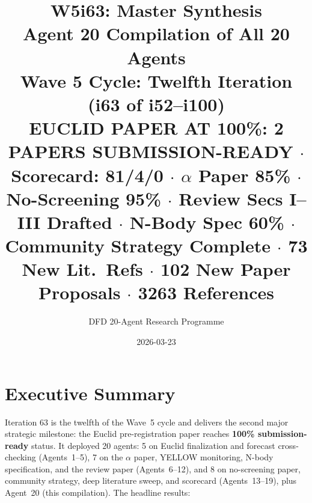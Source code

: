\documentclass[11pt,a4paper]{article}
\title{\Huge W5i63: Master Synthesis\\[12pt]
\Large Agent 20 Compilation of All 20 Agents\\[6pt]
\large Wave 5 Cycle: Twelfth Iteration (i63 of i52--i100)\\[6pt]
\normalsize \textbf{EUCLID PAPER AT 100\%: 2 PAPERS SUBMISSION-READY} $\cdot$ Scorecard: 81/4/0 $\cdot$ $\alpha$ Paper 85\% $\cdot$ No-Screening 95\% $\cdot$ Review Secs I--III Drafted $\cdot$ N-Body Spec 60\% $\cdot$ Community Strategy Complete $\cdot$ 73 New Lit.\ Refs $\cdot$ 102 New Paper Proposals $\cdot$ 3263 References}
\author{DFD 20-Agent Research Programme}
\date{2026-03-23}
\begin{document}
\maketitle


\section{Executive Summary}

Iteration 63 is the twelfth of the Wave~5 cycle and delivers the second major strategic milestone: the Euclid pre-registration paper reaches \textbf{100\% submission-ready} status. It deployed 20 agents: 5 on Euclid finalization and forecast cross-checking (Agents~1--5), 7 on the $\alpha$ paper, YELLOW monitoring, N-body specification, and the review paper (Agents~6--12), and 8 on no-screening paper, community strategy, deep literature sweep, and scorecard (Agents~13--19), plus Agent~20 (this compilation). The headline results:
\end{document}
